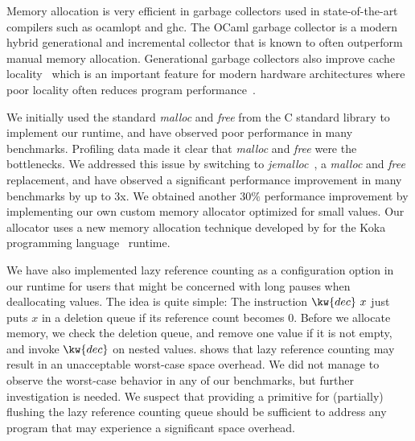 Memory allocation is very efficient in garbage collectors used in
state-of-the-art compilers such as ocamlopt and ghc. The OCaml garbage
collector is a modern hybrid generational and incremental collector
that is known to often outperform manual memory
allocation. Generational garbage collectors also improve cache
locality~\cite{ZornGC} which is an important feature for modern
hardware architectures where poor locality often reduces program
performance~\cite{cachelocality}.

We initially used the standard \emph{malloc} and \emph{free} from the C standard library to implement
our runtime, and have observed poor performance in many benchmarks.
Profiling data made it clear that \emph{malloc} and \emph{free} were the bottlenecks.
We addressed this issue by switching to \emph{jemalloc}~\cite{jemalloc}, a \emph{malloc}
and \emph{free} replacement, and have observed a significant performance
improvement in many benchmarks by up to 3x. We obtained another $30\%$
performance improvement by implementing our own custom memory allocator
optimized for small values. Our allocator uses a new memory allocation
technique developed by \citet{freelistsharding} for the Koka programming
language~\cite{Koka} runtime.

We have also implemented lazy reference counting as a configuration option
in our runtime for users that might be concerned with long pauses when
deallocating values. The idea is quite simple: The instruction
$\kw{dec}\ x$ just puts $x$ in a deletion queue if its reference count
becomes $0$.  Before we allocate memory, we check the deletion queue,
and remove one value if it is not empty, and invoke $\kw{dec}$ on
nested values. \citet{BoehmCostRC} shows that lazy reference
counting may result in an unacceptable worst-case space overhead. We
did not manage to observe the worst-case behavior in any of our
benchmarks, but further investigation is needed. We suspect that
providing a primitive for (partially) flushing the lazy reference
counting queue should be sufficient to address any program that may
experience a significant space overhead.
